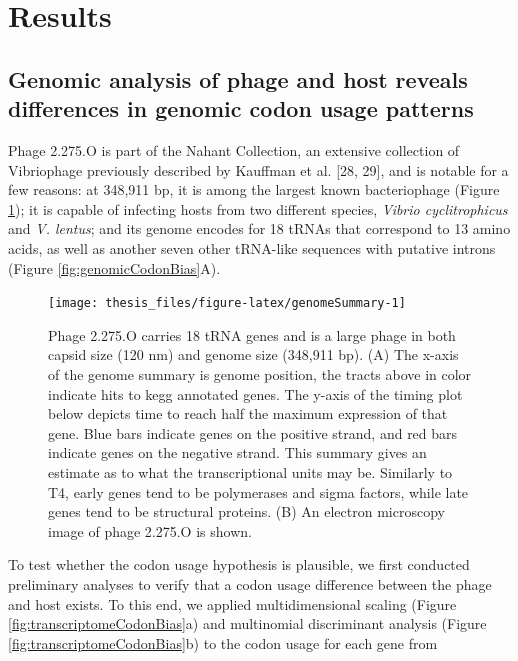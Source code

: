 \documentclass[12pt,twoside]{mitthesis-manusdown}
\begin{document}
\section{Results}\label{results}

\subsection{Genomic analysis of phage and host reveals differences in
genomic codon usage
patterns}\label{genomic-analysis-of-phage-and-host-reveals-differences-in-genomic-codon-usage-patterns}

Phage 2.275.O is part of the Nahant Collection, an extensive collection
of Vibriophage previously described by Kauffman et al. {[}28, 29{]}, and
is notable for a few reasons: at 348,911 bp, it is among the largest
known bacteriophage (Figure \ref{fig:genomeSummary}); it is capable of
infecting hosts from two different species, \emph{Vibrio cyclitrophicus}
and \emph{V. lentus}; and its genome encodes for 18 tRNAs that
correspond to 13 amino acids, as well as another seven other tRNA-like
sequences with putative introns (Figure \ref{fig:genomicCodonBias}A).
\begin{figure}[tb!]

{\centering \texttt{[image: thesis\_files/figure-latex/genomeSummary-1]} 

}

\caption{\label{fig:genomeSummary}Phage 2.275.O carries 18 tRNA genes and is a large phage in both capsid size (120 nm) and genome size (348,911 bp). (A) The x-axis of the genome summary is genome position, the tracts above in color indicate hits to kegg annotated genes. The y-axis of the timing plot below depicts time to reach half the maximum expression of that gene. Blue bars indicate genes on the positive strand, and red bars indicate genes on the negative strand. This summary gives an estimate as to what the transcriptional units may be. Similarly to T4, early genes tend to be polymerases and sigma factors, while late genes tend to be structural proteins. (B) An electron microscopy image of phage 2.275.O is shown.}\label{fig:genomeSummary}
\end{figure}
To test whether the codon usage hypothesis is plausible, we first
conducted preliminary analyses to verify that a codon usage difference
between the phage and host exists. To this end, we applied
multidimensional scaling (Figure \ref{fig:transcriptomeCodonBias}a) and
multinomial discriminant analysis (Figure
\ref{fig:transcriptomeCodonBias}b) to the codon usage for each gene from
\end{document}
